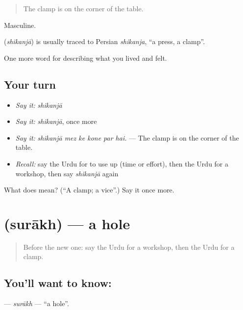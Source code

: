 \begin{quote}
The clamp is on the corner of the table.
\end{quote}

Masculine.

\begin{cousinweb}
\textbf{} (\emph{shikanjā}) is usually traced to Persian \emph{shikanja}, \textquotedblleft{}a press, a clamp\textquotedblright{}.
\end{cousinweb}

\begin{grammarlens}[title={What you've built}]
One more word for describing what you lived and felt.
\end{grammarlens}

\subsection*{Your turn}
\begin{itemize}
\raggedright
  \item \emph{Say it:} \emph{shikanjā}
  \item \emph{Say it:} \emph{shikanjā}, once more
  \item \emph{Say it:} \emph{shikanjā mez ke kone par hai.} — The clamp is on the corner of the table.
  \item \emph{Recall:} say the Urdu for to use up (time or effort), then the Urdu for a workshop, then say \emph{shikanjā} again
\end{itemize}

\begin{tcolorbox}[breakable,colback=teal!4,colframe=teal!35!black,title={Before you move on}]
What does  mean? (\textquotedblleft{}A clamp; a vice\textquotedblright{}.) Say it once more.
\end{tcolorbox}
\section[\texorpdfstring{\ur{سوراخ} (surākh)}{سوراخ (surākh)}]{ (surākh) — a hole}

\label{lesson:UR-C496-surakh}



\begin{quote}
Before the new one: say the Urdu for a workshop, then the Urdu for a clamp.
\end{quote}

\subsection*{You'll want to know: }
\textbf{} — \emph{surākh} — \textquotedblleft{}a hole\textquotedblright{}.


